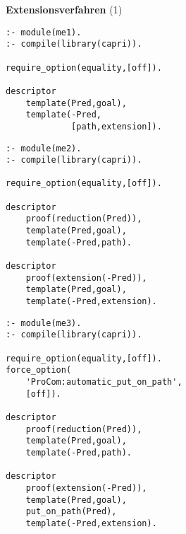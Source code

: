\begin{Slide}
  \large\bf

  {\Large\bf Extensionsverfahren} (1)
  \SPACE
\begin{minipage}{.9\textwidth}
\begin{verbatim}
:- module(me1).
:- compile(library(capri)).

require_option(equality,[off]).

descriptor
    template(Pred,goal),
    template(-Pred,
             [path,extension]).
\end{verbatim}
\end{minipage}

\end{Slide}
\begin{Slide}
  \large\bf

\begin{minipage}{.9\textwidth}
\begin{verbatim}
:- module(me2).
:- compile(library(capri)).

require_option(equality,[off]).

descriptor
    proof(reduction(Pred)),
    template(Pred,goal),
    template(-Pred,path).

descriptor
    proof(extension(-Pred)),
    template(Pred,goal),
    template(-Pred,extension).
\end{verbatim}
\end{minipage}

\end{Slide}
\begin{Slide}
  \large\bf
  \SPACE
\begin{minipage}{\textwidth}
\begin{verbatim}
:- module(me3).
:- compile(library(capri)).

require_option(equality,[off]).
force_option(
    'ProCom:automatic_put_on_path',
    [off]).

descriptor
    proof(reduction(Pred)),
    template(Pred,goal),
    template(-Pred,path).

descriptor
    proof(extension(-Pred)),
    template(Pred,goal),
    put_on_path(Pred),
    template(-Pred,extension).
\end{verbatim}
\end{minipage}

\end{Slide}

